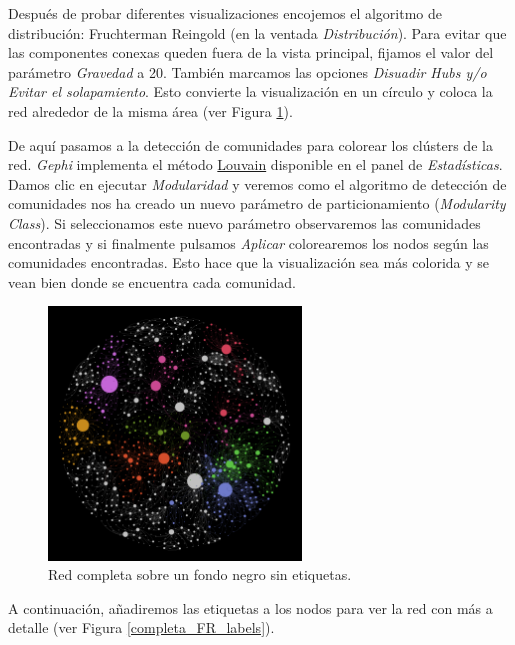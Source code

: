 \documentclass{uimppracticas}
\begin{document}
Después de probar diferentes visualizaciones encojemos el algoritmo de distribución: Fruchterman Reingold (en la ventada \textit{Distribución}). Para evitar que las componentes conexas queden fuera de la vista principal, fijamos el valor del parámetro \textit{Gravedad} a 20. También marcamos las opciones \textit{Disuadir Hubs y/o Evitar el solapamiento}. Esto convierte la visualización en un círculo y coloca la red alrededor de la misma área (ver Figura \ref{completa_negro_FR}). 

De aquí pasamos a la detección de comunidades para colorear los clústers de la red. \textit{Gephi} implementa el método \href{https://es.wikipedia.org/wiki/M\%C3\%A9todo_de_Louvain}{Louvain} disponible en el panel de \textit{Estadísticas}. Damos clic en ejecutar \textit{Modularidad} y veremos como el algoritmo de detección de comunidades nos ha creado un nuevo parámetro de particionamiento (\textit{Modularity Class}). Si seleccionamos este nuevo parámetro observaremos las comunidades encontradas y si finalmente pulsamos \textit{Aplicar} colorearemos los nodos según las comunidades encontradas. Esto hace que la visualización sea más colorida y se vean bien donde se encuentra cada comunidad.

\begin{figure}[H]
	\centering
	\includegraphics[width=0.6\textwidth]{images/completa_negro_FR}
	\caption{Red completa sobre un fondo negro sin etiquetas.}
	\label{completa_negro_FR}
\end{figure}

A continuación, añadiremos las etiquetas a los nodos para ver la red con más a detalle (ver Figura \ref{completa_FR_labels}). 
\end{document}
